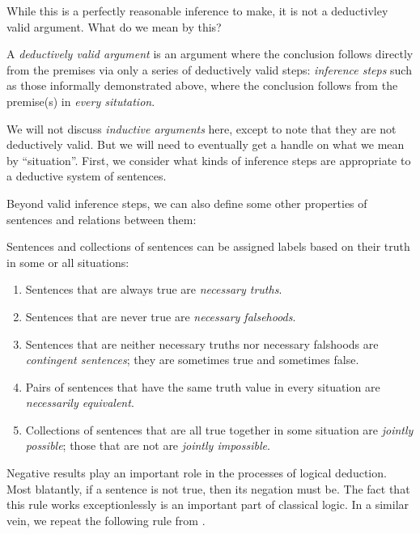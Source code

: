 While this is a perfectly reasonable inference to make, it is not a deductivley
valid argument. What do we mean by this?

\begin{definition}
  A \emph{deductively valid argument} is an argument where the conclusion
  follows directly from the premises via only a series of deductively valid
  steps: \emph{inference steps} such as those informally demonstrated above,
  where the conclusion follows from the premise(s) in \emph{every situtation}.
  \label{def:deductively-valid}
\end{definition}

We will not discuss \emph{inductive arguments} here, except to note that they
are not deductively valid. But we will need to eventually get a handle on what
we mean by ``situation''. First, we consider what kinds of inference steps are
appropriate to a deductive system of sentences.

Beyond valid inference steps, we can also define some other properties of
sentences and relations between them:

\begin{definition}
  Sentences and collections of sentences can be assigned labels based on their
  truth in some or all situations:
  
  \begin{enumerate}
  \item Sentences that are always true are \emph{necessary truths}.
  \item Sentences that are never true are \emph{necessary falsehoods}.
  \item Sentences that are neither necessary truths nor necessary falshoods are
    \emph{contingent sentences}; they are sometimes true and sometimes false.
  \item Pairs of sentences that have the same truth value in every situation
    are \emph{necessarily equivalent}.
  \item Collections of sentences that are all true together in some situation
    are \emph{jointly possible}; those that are not are \emph{jointly
    impossible}.
  \end{enumerate}
  
\end{definition}

Negative results play an important role in the processes of logical deduction.
Most blatantly, if a sentence is not true, then its negation must be. The fact
that this rule works exceptionlessly is an important part of classical logic. In
a similar vein, we repeat the following rule from \cite[p. 13]{Smi20}.

